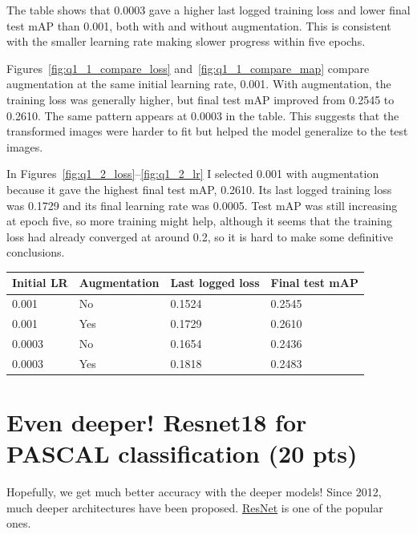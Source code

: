 \begin{itemize}
\begin{itemize}
\begin{solution}
The table shows that 0.0003 gave a higher last logged training loss and lower
final test mAP than 0.001, both with and without augmentation. This is
consistent with the smaller learning rate making slower progress within five
epochs.

Figures~\ref{fig:q1_1_compare_loss} and~\ref{fig:q1_1_compare_map} compare
augmentation at the same initial learning rate, 0.001. With augmentation,
the training loss was generally higher, but final test mAP improved from
0.2545 to 0.2610. The same pattern appears at 0.0003 in the table. This
suggests that the transformed images were harder to fit but helped the model
generalize to the test images.

In Figures~\ref{fig:q1_2_loss}--\ref{fig:q1_2_lr} I selected 0.001 with augmentation because it gave the highest final test
mAP, 0.2610. 
Its last logged training loss was 0.1729 and its final learning rate was
0.0005. Test mAP was still increasing at epoch five, so more training might
help, although it seems that the training loss had already converged at around 0.2, so it is hard to make some definitive conclusions.

\begin{center}
\begin{tabular}{llll}
Initial LR & Augmentation & Last logged loss & Final test mAP \\
\hline
0.001 & No & 0.1524 & 0.2545 \\
0.001 & Yes & 0.1729 & 0.2610 \\
0.0003 & No & 0.1654 & 0.2436 \\
0.0003 & Yes & 0.1818 & 0.2483 \\
\end{tabular}
\end{center}

\end{solution}
    \end{itemize}
\end{itemize}

\clearpage

\section{Even deeper! Resnet18 for PASCAL classification (20 pts)}

Hopefully, we get much better accuracy with the deeper models! Since 2012, much deeper architectures have been proposed. \href{https://arxiv.org/abs/1512.03385}{ResNet} is one of the popular ones.

